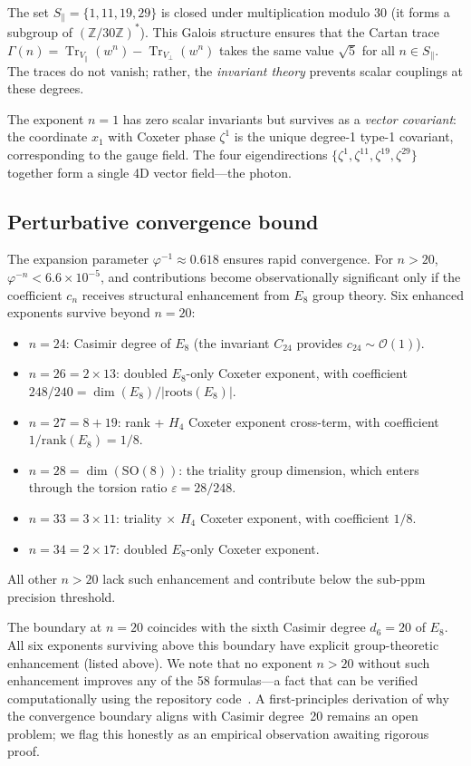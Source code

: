 \documentclass[aps,prd,twocolumn,superscriptaddress,nofootinbib,showpacs]{revtex4-2}
\newcommand{\Tr}{\operatorname{Tr}}
\begin{document}
The set $S_\parallel = \{1,11,19,29\}$ is closed under multiplication
modulo 30 (it forms a subgroup of $(\mathbb{Z}/30\mathbb{Z})^*$).
This Galois structure ensures that the Cartan trace $\Gamma(n) =
\Tr_{V_\parallel}(w^n) - \Tr_{V_\perp}(w^n)$ takes the same value
$\sqrt{5}$ for all $n \in S_\parallel$.  The traces do not vanish;
rather, the \emph{invariant theory} prevents scalar couplings at these
degrees.

The exponent $n = 1$ has zero scalar invariants but survives as a
\emph{vector covariant}: the coordinate $x_1$ with Coxeter phase
$\zeta^1$ is the unique degree-1 type-1 covariant, corresponding to
the gauge field.  The four eigendirections $\{\zeta^1, \zeta^{11},
\zeta^{19}, \zeta^{29}\}$ together form a single 4D vector
field---the photon.

\subsection{Perturbative convergence bound}\label{sec:rule2}

The expansion parameter $\varphi^{-1} \approx 0.618$ ensures rapid
convergence.  For $n > 20$, $\varphi^{-n} < 6.6 \times 10^{-5}$, and
contributions become observationally significant only if the
coefficient $c_n$ receives structural enhancement from $E_8$ group
theory.  Six enhanced exponents survive beyond $n = 20$:
\begin{itemize}
\item $n = 24$: Casimir degree of $E_8$ (the invariant $C_{24}$
provides $c_{24} \sim \mathcal{O}(1)$).
\item $n = 26 = 2 \times 13$: doubled $E_8$-only Coxeter exponent,
with coefficient $248/240 = \dim(E_8)/|\text{roots}(E_8)|$.
\item $n = 27 = 8 + 19$: rank + $H_4$ Coxeter exponent cross-term,
with coefficient $1/\text{rank}(E_8) = 1/8$.
\item $n = 28 = \dim(\mathrm{SO}(8))$: the triality group dimension,
which enters through the torsion ratio $\varepsilon = 28/248$.
\item $n = 33 = 3 \times 11$: triality $\times$ $H_4$ Coxeter
exponent, with coefficient $1/8$.
\item $n = 34 = 2 \times 17$: doubled $E_8$-only Coxeter exponent.
\end{itemize}
All other $n > 20$ lack such enhancement and contribute below the
sub-ppm precision threshold.

The boundary at $n = 20$ coincides with the sixth Casimir degree
$d_6 = 20$ of $E_8$.  All six exponents surviving above this boundary
have explicit group-theoretic enhancement (listed above).  We note
that no exponent $n > 20$ without such enhancement improves any of the
58 formulas---a fact that can be verified computationally using the
repository code~\cite{GSMrepo}.  A first-principles derivation of why
the convergence boundary aligns with Casimir degree~20 remains an open
problem; we flag this honestly as an empirical observation awaiting
rigorous proof.
\end{document}

